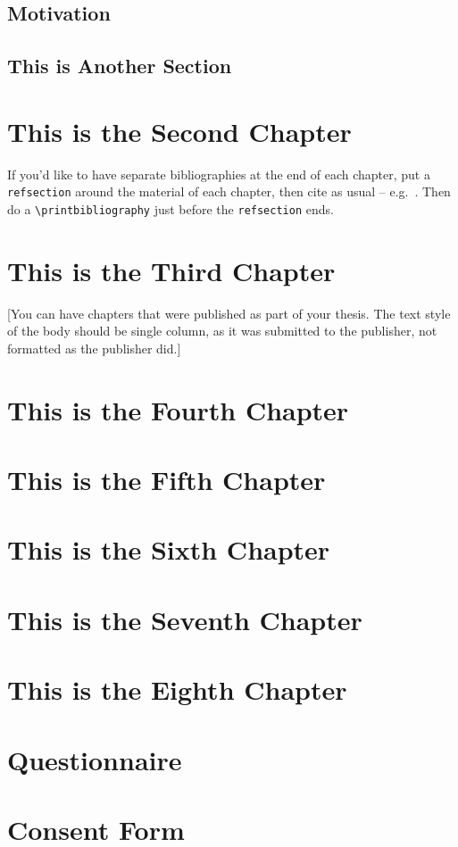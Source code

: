 \documentclass[12pt]{caltech_thesis}
\begin{document}
\section{Motivation}


\section{This is Another Section}
\lipsum[6-7] 

\chapter{This is the Second Chapter}
\begin{refsection}
If you'd like to have separate bibliographies at the end of each chapter, put a \verb|refsection| around the material of each chapter, then cite as usual -- e.g.~\citep{GMP81,Ful83}. Then do a \verb|\printbibliography| just before the \verb|refsection| ends. 

\printbibliography[heading=subbibliography]
\end{refsection}


\chapter{This is the Third Chapter}


[You can have chapters that were published as part of your thesis. The text style of the body should be single column, as it was submitted to the publisher, not formatted as the publisher did.]

\chapter{This is the Fourth Chapter}
\chapter{This is the Fifth Chapter}
\chapter{This is the Sixth Chapter}
\chapter{This is the Seventh Chapter}
\chapter{This is the Eighth Chapter}

\printbibliography[heading=bibintoc]

\appendix

\chapter{Questionnaire}
\chapter{Consent Form}

\printindex

\theendnotes

\pocketmaterial
{} 
\end{document}
